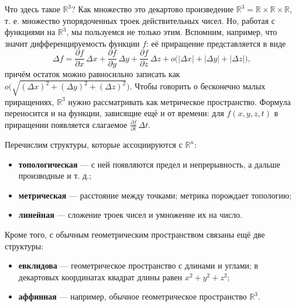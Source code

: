 \documentclass[11pt,a4paper]{article}
\begin{document}
Что здесь такое $\mathbb{R}^3$? Как множество это декартово произведение $\mathbb{R}^3 = \mathbb{R} \times \mathbb{R} \times \mathbb{R}$, т. е. множество упорядоченных троек действительных чисел. Но, работая с функциями на $\mathbb{R}^3$, мы пользуемся не только этим. Вспомним, например, что значит дифференцируемость функции $f$: её приращение представляется в виде
\[
\Delta f = \frac{\partial f}{\partial x}\,\Delta x + \frac{\partial f}{\partial y}\,\Delta y + \frac{\partial f}{\partial z}\,\Delta z + o\bigl(|\Delta x| + |\Delta y| + |\Delta z|\bigr), \tag{1}
\]
причём остаток можно равносильно записать как $o\bigl(\sqrt{(\Delta x)^2 + (\Delta y)^2 + (\Delta z)^2}\bigr)$. Чтобы говорить о бесконечно малых приращениях, $\mathbb{R}^3$ нужно рассматривать как метрическое пространство. Формула переносится и на функции, зависящие ещё и от времени: для $f(x, y, z, t)$ в приращении появляется слагаемое $\frac{\partial f}{\partial t}\,\Delta t$.

Перечислим структуры, которые ассоциируются с $\mathbb{R}^n$:

\begin{itemize}
\item \textbf{топологическая} — с ней появляются предел и непрерывность, а дальше производные и т. д.;
\item \textbf{метрическая} — расстояние между точками; метрика порождает топологию;
\item \textbf{линейная} — сложение троек чисел и умножение их на число.
\end{itemize}

Кроме того, с обычным геометрическим пространством связаны ещё две структуры:

\begin{itemize}
\item \textbf{евклидова} — геометрическое пространство с длинами и углами; в декартовых координатах квадрат длины равен $x^2 + y^2 + z^2$;
\item \textbf{аффинная} — например, обычное геометрическое пространство $\mathbb{R}^3$.
\end{itemize}

\end{document}
